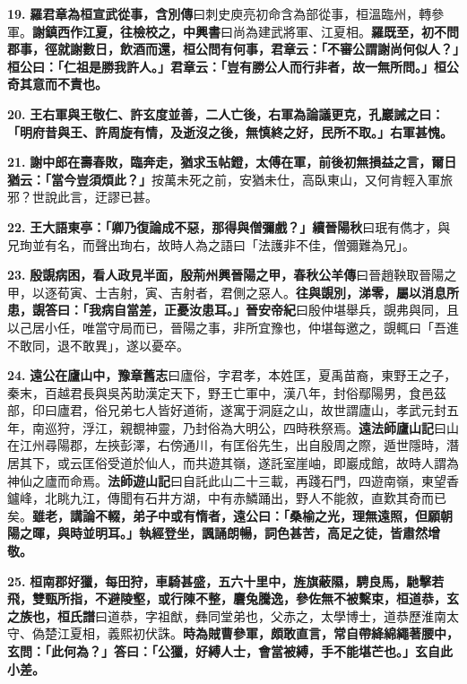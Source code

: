 \textbf{19.} \textbf{羅君章為桓宣武從事，}{\footnotesize \textbf{含別傳}曰刺史庾亮初命含為部從事，桓溫臨州，轉參軍。}\textbf{謝鎮西作江夏，往檢校之，}{\footnotesize \textbf{中興書}曰尚為建武將軍、江夏相。}\textbf{羅既至，初不問郡事，徑就謝數日，飲酒而還，桓公問有何事，君章云：「不審公謂謝尚何似人？」桓公曰：「仁祖是勝我許人。」君章云：「豈有勝公人而行非者，故一無所問。」桓公奇其意而不責也。}

\textbf{20.} \textbf{王右軍與王敬仁、許玄度並善，二人亡後，右軍為論議更克，孔巖誡之曰：「明府昔與王、許周旋有情，及逝沒之後，無慎終之好，民所不取。」右軍甚愧。}

\textbf{21.} \textbf{謝中郎在壽春敗，臨奔走，猶求玉帖鐙，太傅在軍，前後初無損益之言，爾日猶云：「當今豈須煩此？」}{\footnotesize 按萬未死之前，安猶未仕，高臥東山，又何肯輕入軍旅邪？世說此言，迂謬已甚。}

\textbf{22.} \textbf{王大語東亭：「卿乃復論成不惡，那得與僧彌戲？」}{\footnotesize \textbf{續晉陽秋}曰珉有儁才，與兄珣並有名，而聲出珣右，故時人為之語曰「法護非不佳，僧彌難為兄」。}

\textbf{23.} \textbf{殷覬病困，看人政見半面，殷荊州興晉陽之甲，}{\footnotesize \textbf{春秋公羊傳}曰晉趙鞅取晉陽之甲，以逐荀寅、士吉射，寅、吉射者，君側之惡人。}\textbf{往與覬別，涕零，屬以消息所患，覬答曰：「我病自當差，正憂汝患耳。」}{\footnotesize \textbf{晉安帝紀}曰殷仲堪舉兵，覬弗與同，且以己居小任，唯當守局而已，晉陽之事，非所宜豫也，仲堪每邀之，覬輒曰「吾進不敢同，退不敢異」，遂以憂卒。}

\textbf{24.} \textbf{遠公在廬山中，}{\footnotesize \textbf{豫章舊志}曰廬俗，字君孝，本姓匡，夏禹苗裔，東野王之子，秦末，百越君長與吳芮助漢定天下，野王亡軍中，漢八年，封俗鄢陽男，食邑茲部，印曰廬君，俗兄弟七人皆好道術，遂寓于洞庭之山，故世謂廬山，孝武元封五年，南巡狩，浮江，親覩神靈，乃封俗為大明公，四時秩祭焉。\textbf{遠法師廬山記}曰山在江州尋陽郡，左挾彭澤，右傍通川，有匡俗先生，出自殷周之際，遁世隱時，潛居其下，或云匡俗受道於仙人，而共遊其嶺，遂託室崖岫，即巖成館，故時人謂為神仙之廬而命焉。\textbf{法師遊山記}曰自託此山二十三載，再踐石門，四遊南嶺，東望香鑪峰，北眺九江，傳聞有石井方湖，中有赤鱗踊出，野人不能敘，直歎其奇而已矣。}\textbf{雖老，講論不輟，弟子中或有惰者，遠公曰：「桑榆之光，理無遠照，但願朝陽之暉，與時並明耳。」執經登坐，諷誦朗暢，詞色甚苦，高足之徒，皆肅然增敬。}

\textbf{25.} \textbf{桓南郡好獵，每田狩，車騎甚盛，五六十里中，旌旗蔽隰，騁良馬，馳擊若飛，雙甄所指，不避陵壑，或行陳不整，麏兔騰逸，參佐無不被繫束，桓道恭，玄之族也，}{\footnotesize \textbf{桓氏譜}曰道恭，字祖猷，彝同堂弟也，父赤之，太學博士，道恭歷淮南太守、偽楚江夏相，義熙初伏誅。}\textbf{時為賊曹參軍，頗敢直言，常自帶絳綿繩著腰中，玄問：「此何為？」答曰：「公獵，好縛人士，會當被縛，手不能堪芒也。」玄自此小差。}

